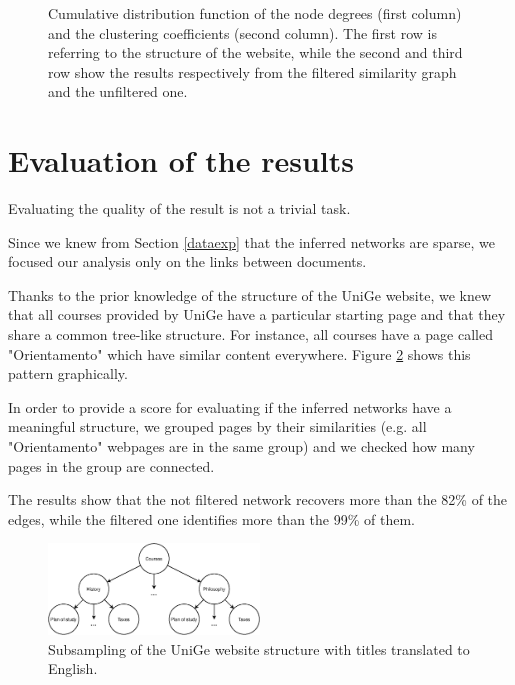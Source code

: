 \begin{figure}[ht]
    \caption{Cumulative distribution function of the node degrees (first column) 
    and the clustering coefficients (second column).
    The first row is referring to the structure of the website, while
    the second and third row show the results respectively from the filtered similarity graph and the unfiltered one.}
    \label{fig:exploration}
\end{figure}



\section{Evaluation of the results} \label{eval}

Evaluating the quality of the result is not a trivial task. 

Since we knew from Section \ref{dataexp} that the inferred networks are sparse, 
we focused our analysis only on the links between documents. 

Thanks to the prior knowledge of the structure of the UniGe website, we knew that 
all courses provided by UniGe have a particular starting page and that
they share a common tree-like structure. 
For instance, all courses have a page called "Orientamento" which have similar content everywhere. 
Figure \ref{fig:unige-structure} shows this pattern graphically.

In order to provide a score for evaluating if the inferred networks have a meaningful structure, 
we grouped pages by their similarities (e.g. all "Orientamento" webpages are in the same group) and 
we checked how many pages in the group are connected. 

The results show that the not filtered network recovers more than the 82\% of the edges, 
while the filtered one identifies more than the 99\% of them. 

\begin{figure}[H]
    \centering
    \includegraphics[width=0.5\textwidth]{images/unige-structure.eps}
    \caption{Subsampling of the UniGe website structure with titles translated to English.}
    \label{fig:unige-structure}
\end{figure}



